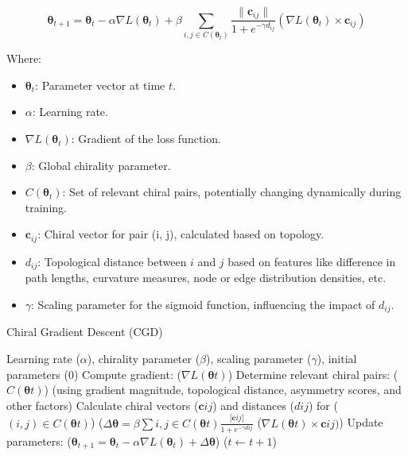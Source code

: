 \documentclass[12pt, a4paper]{article}
\begin{document}
\begin{equation} \label{eq:cgd_sigmoid_final}
\boldsymbol{\theta}_{t+1} = \boldsymbol{\theta}_t - \alpha \nabla L(\boldsymbol{\theta}_t) + \beta \sum_{i,j \in C(\boldsymbol{\theta}_t)}  \frac{\| \mathbf{c}_{ij} \|}{1 + e^{-\gamma d_{ij}}} (\nabla L(\boldsymbol{\theta}_t) \times \mathbf{c}_{ij})
\end{equation}

Where:

\begin{itemize}
    \item \(\boldsymbol{\theta}_t\): Parameter vector at time \(t\).
    \item \(\alpha\): Learning rate.
    \item \(\nabla L(\boldsymbol{\theta}_t)\): Gradient of the loss function.
    \item \(\beta\): Global chirality parameter.
    \item \(C(\boldsymbol{\theta}_t)\): Set of relevant chiral pairs, potentially changing dynamically during training.
    \item \(\mathbf{c}_{ij}\): Chiral vector for pair (i, j), calculated based on topology.
    \item \(d_{ij}\): Topological distance between \(i\) and \(j\) based on features like difference in path lengths, curvature measures, node or edge distribution densities, etc.
    \item \(\gamma\): Scaling parameter for the sigmoid function, influencing the impact of \(d_{ij}\).
\end{itemize}

\begin{algorithm}
\caption{Chiral Gradient Descent (CGD)}
\label{alg:cgd}
\begin{algorithmic}
\Require Learning rate ($\alpha$), chirality parameter ($\beta$), scaling parameter ($\gamma$), initial parameters (\boldsymbol{\theta}0)
	\State Compute gradient: ($\nabla L(\boldsymbol{\theta}t)$)
	\State Determine relevant chiral pairs: ($C(\boldsymbol{\theta}t)$) (using gradient magnitude, topological distance, asymmetry scores, and other factors)
	\State Calculate chiral vectors ($\mathbf{c}{ij}$) and distances ($d{ij}$) for ($(i, j) \in C(\boldsymbol{\theta}t)$)
	\State ($\Delta \boldsymbol{\theta} = \beta \sum{i,j \in C(\boldsymbol{\theta}t)} \frac{| \mathbf{c}{ij} |}{1 + e^{-\gamma d{ij}}}$ ($\nabla L(\boldsymbol{\theta}t) \times \mathbf{c}{ij})$)
	\State Update parameters: ($\boldsymbol{\theta}_{t+1} = \boldsymbol{\theta}_t - \alpha \nabla L(\boldsymbol{\theta}_t) + \Delta \boldsymbol{\theta}$)
	\State ($t \gets t + 1$)
\EndWhile
\end{algorithmic}
\end{algorithm}
\end{document}

